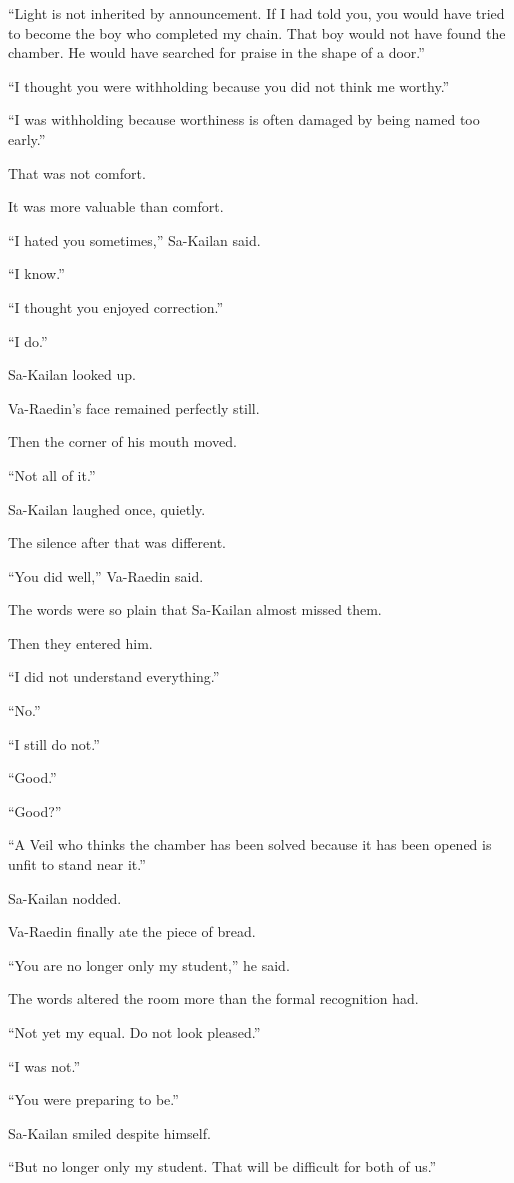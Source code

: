 “Light is not inherited by announcement. 
If I had told you, you would have tried to become the boy who completed my chain. 
That boy would not have found the chamber. 
He would have searched for praise in the shape of a door.”\par
“I thought you were withholding because you did not think me worthy.”\par
“I was withholding because worthiness is often damaged by being named too early.”\par
That was not comfort.\par
It was more valuable than comfort.\par
“I hated you sometimes,” Sa-Kailan said.\par
“I know.”\par
“I thought you enjoyed correction.”\par
“I do.”\par
Sa-Kailan looked up.\par
Va-Raedin’s face remained perfectly still.\par
Then the corner of his mouth moved.\par
“Not all of it.”\par
Sa-Kailan laughed once, quietly.\par
The silence after that was different.\par
“You did well,” Va-Raedin said.\par
The words were so plain that Sa-Kailan almost missed them.\par
Then they entered him.\par
“I did not understand everything.”\par
“No.”\par
“I still do not.”\par
“Good.”\par
“Good?”\par
“A Veil who thinks the chamber has been solved because it has been opened is unfit to stand near it.”\par
Sa-Kailan nodded.\par
Va-Raedin finally ate the piece of bread.\par
“You are no longer only my student,” he said.\par
The words altered the room more than the formal recognition had.\par
“Not yet my equal. Do not look pleased.”\par
“I was not.”\par
“You were preparing to be.”\par
Sa-Kailan smiled despite himself.\par
“But no longer only my student. That will be difficult for both of us.”\par



